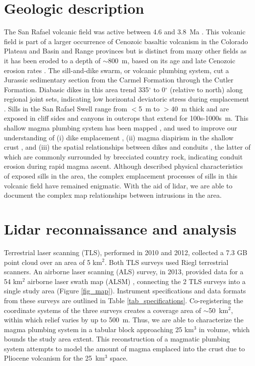 \section{Geologic description}

The San Rafael volcanic field was active between 4.6 and 3.8~Ma \citep{delaney1997physical}. This volcanic field is part of a larger occurrence of Cenozoic basaltic volcanism in the Colorado Plateau and Basin and Range provinces but is distinct from many other fields as it has been eroded to a depth of $\sim$800~m, based on its age and late Cenozoic erosion rates \citep[e.g.]{pederson2002colorado}. The sill-and-dike swarm, or volcanic plumbing system, cut a Jurassic sedimentary section from the Carmel Formation through the Cutler Formation. Diabasic dikes in this area trend 335$^{\circ}$ to 0$^{\circ}$ (relative to north) along regional joint sets, indicating low horizontal deviatoric stress during emplacement \citep{delaney1997physical}. Sills in the San Rafael Swell range from $<$5~m to $>$40~m thick and are exposed in cliff sides and canyons in outcrops that extend for 100s-1000s~m. This shallow magma plumbing system has been mapped \citep{delaney1997physical}, and used to improve our understanding of (i) dike emplacement \citep{delaney1986field}, (ii) magma diapirism in the shallow crust \citep{diez2009evidence}, and (iii) the spatial relationships between dikes and conduits \citep{kiyosugi2012relationship}, the latter of which are commonly surrounded by brecciated country rock, indicating conduit erosion during rapid magma ascent. Although \citet{gartner1986geometry} described physical characteristics of exposed sills in the area, the complex emplacement processes of sills in this volcanic field have remained enigmatic. With the aid of lidar, we are able to document the complex map relationships between intrusions in the area.

\section{Lidar reconnaissance and analysis}\label{sec_lidarrec}

Terrestrial laser scanning (TLS), performed in 2010 and 2012, collected a 7.3 GB point cloud over an area of 5 km$^2$. Both TLS surveys used Riegl terrestrial scanners. An airborne laser scanning (ALS) survey, in 2013, provided data for a 54 km$^2$ airborne laser swath map (ALSM) \citep{richardson2013alsm}, connecting the 2 TLS surveys into a single study area (Figure \ref{fig_map}). Instrument specifications and data formats from these surveys are outlined in Table \ref{tab_specifications}. Co-registering the coordinate systems of the three surveys creates a coverage area of $\sim$50~km$^2$, within which relief varies by up to 500~m. Thus, we are able to characterize the magma plumbing system in a tabular block approaching 25 km$^3$ in volume, which bounds the study area extent. This reconstruction of a magmatic plumbing system attempts to model the amount of magma emplaced into the crust due to Pliocene volcanism for the 25~km$^3$ space.

